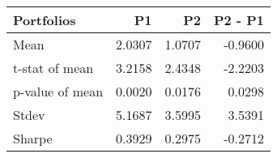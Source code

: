 \begin{tabular}{lrrr}
\toprule
Portfolios & P1 & P2 & P2 - P1 \\
\midrule
Mean & 2.0307 & 1.0707 & -0.9600 \\
t-stat of mean & 3.2158 & 2.4348 & -2.2203 \\
p-value of mean & 0.0020 & 0.0176 & 0.0298 \\
Stdev & 5.1687 & 3.5995 & 3.5391 \\
Sharpe & 0.3929 & 0.2975 & -0.2712 \\
\bottomrule
\end{tabular}
